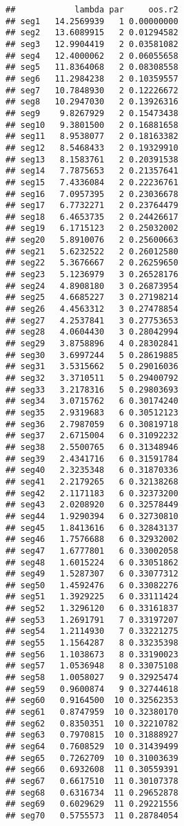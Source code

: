 \documentclass[
]{article}
\begin{document}
\begin{verbatim}
##            lambda par     oos.r2
## seg1   14.2569939   1 0.00000000
## seg2   13.6089915   2 0.01294582
## seg3   12.9904419   2 0.03581082
## seg4   12.4000062   2 0.06055658
## seg5   11.8364068   2 0.08308558
## seg6   11.2984238   2 0.10359557
## seg7   10.7848930   2 0.12226672
## seg8   10.2947030   2 0.13926316
## seg9    9.8267929   2 0.15473438
## seg10   9.3801500   2 0.16881658
## seg11   8.9538077   2 0.18163382
## seg12   8.5468433   2 0.19329910
## seg13   8.1583761   2 0.20391538
## seg14   7.7875653   2 0.21357641
## seg15   7.4336084   2 0.22236761
## seg16   7.0957395   2 0.23036678
## seg17   6.7732271   2 0.23764479
## seg18   6.4653735   2 0.24426617
## seg19   6.1715123   2 0.25032002
## seg20   5.8910076   2 0.25600663
## seg21   5.6232522   2 0.26012580
## seg22   5.3676667   2 0.26259650
## seg23   5.1236979   3 0.26528176
## seg24   4.8908180   3 0.26873954
## seg25   4.6685227   3 0.27198214
## seg26   4.4563312   3 0.27478854
## seg27   4.2537841   3 0.27753653
## seg28   4.0604430   3 0.28042994
## seg29   3.8758896   4 0.28302841
## seg30   3.6997244   5 0.28619885
## seg31   3.5315662   5 0.29016036
## seg32   3.3710511   5 0.29400792
## seg33   3.2178316   5 0.29803693
## seg34   3.0715762   6 0.30174240
## seg35   2.9319683   6 0.30512123
## seg36   2.7987059   6 0.30819718
## seg37   2.6715004   6 0.31092232
## seg38   2.5500765   6 0.31348946
## seg39   2.4341716   6 0.31591784
## seg40   2.3235348   6 0.31870336
## seg41   2.2179265   6 0.32138268
## seg42   2.1171183   6 0.32373200
## seg43   2.0208920   6 0.32578449
## seg44   1.9290394   6 0.32730810
## seg45   1.8413616   6 0.32843137
## seg46   1.7576688   6 0.32932002
## seg47   1.6777801   6 0.33002058
## seg48   1.6015224   6 0.33051862
## seg49   1.5287307   6 0.33077312
## seg50   1.4592476   6 0.33082276
## seg51   1.3929225   6 0.33111424
## seg52   1.3296120   6 0.33161837
## seg53   1.2691791   7 0.33197207
## seg54   1.2114930   7 0.33221275
## seg55   1.1564287   8 0.33235398
## seg56   1.1038673   8 0.33190023
## seg57   1.0536948   8 0.33075108
## seg58   1.0058027   9 0.32925474
## seg59   0.9600874   9 0.32744618
## seg60   0.9164500  10 0.32562353
## seg61   0.8747959  10 0.32380170
## seg62   0.8350351  10 0.32210782
## seg63   0.7970815  10 0.31888927
## seg64   0.7608529  10 0.31439499
## seg65   0.7262709  10 0.31003639
## seg66   0.6932608  11 0.30559391
## seg67   0.6617510  11 0.30107378
## seg68   0.6316734  11 0.29652878
## seg69   0.6029629  11 0.29221556
## seg70   0.5755573  11 0.28784054

\end{verbatim}
\end{document}
